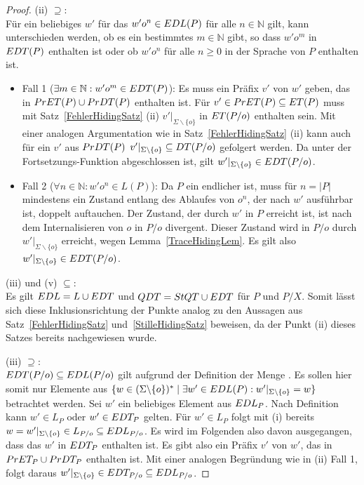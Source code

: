 \begin{proof}
  (ii)  \glqq $\supseteq$\grqq{}:\\
  Für ein beliebiges $w'$ für das $w'o^n\in EDL (P)$ für alle $n\in\mathbb{N}$
  gilt, kann unterschieden werden, ob es ein bestimmtes $m\in\mathbb{N}$ gibt,
  so dass $w'o^m$ in $EDT (P)$ enthalten ist oder ob $w'o^n$ für alle $n\geq
  0$ in der Sprache von $P$ enthalten ist.
  \begin{itemize}
    \item Fall 1 ($\exists m\in\mathbb{N}: w'o^m\in EDT (P)$): Es muss ein
      Präfix $v'$ von $w'$ geben, das in $PrET (P)\cup PrDT (P)$ enthalten
      ist. Für $v'\in PrET (P) \subseteq ET (P)$ muss mit
      Satz~\ref{FehlerHidingSatz} (ii) $v'|_{\Sigma\backslash\{o\}}$ in $ET
      (P/o)$ enthalten sein. Mit einer analogen Argumentation wie in
      Satz~\ref{FehlerHidingSatz} (ii) kann auch für ein $v'$ aus $PrDT (P)$
      $v'|_{\Sigma\backslash\{o\}}\subseteq DT (P/o)$ gefolgert werden. Da
      \EDT{} unter der Fortsetzungs-Funktion \cont{} abgeschlossen ist, gilt
      $w'|_{\Sigma\backslash\{o\}}\in EDT (P/o)$.
    \item Fall 2 ($\forall n\in\mathbb{N}: w'o^n\in L (P)$): Da $P$ ein
      endlicher \MEIO{} ist, muss für $n = |P|$ mindestens ein Zustand entlang
      des Ablaufes von $o^n$, der nach $w'$ ausführbar ist, doppelt auftauchen.
      Der Zustand, der durch $w'$ in $P$ erreicht ist, ist nach dem
      Internalisieren von $o$ in $P/o$ divergent. Dieser Zustand wird in $P/o$
      durch $w'|_{\Sigma\backslash\{o\}}$ erreicht, wegen
      Lemma~\ref{TraceHidingLem}. Es gilt also $w'|_{\Sigma\backslash\{o\}} \in
      EDT (P/o)$.
  \end{itemize}

  (iii) und (v) \glqq $\subseteq$\grqq{}:\\
  Es gilt $EDL = L \cup EDT$ und $QDT = StQT \cup EDT$ für $P$ und $P/X$.
  Somit lässt sich diese Inklusionsrichtung der Punkte analog zu den Aussagen
  aus Satz~\ref{FehlerHidingSatz} und~\ref{StilleHidingSatz} beweisen, da der
  Punkt (ii) dieses Satzes bereits nachgewiesen wurde.

  (iii) \glqq $\supseteq$\grqq{}:\\
  $EDT (P/o)\subseteq EDL (P/o)$ gilt aufgrund der Definition der Menge
  \EDL{}. Es sollen hier somit nur Elemente aus $\{w\in (\Sigma\backslash
  \{o\})^*\mid \exists w'\in EDL(P): w'|_{\Sigma\backslash \{o\}} = w\}$
  betrachtet werden. Sei $w'$ ein beliebiges Element aus $EDL _P$. Nach
  Definition kann $w'\in L_P$ oder $w'\in EDT _P$ gelten. Für $w'\in L_P$ folgt
  mit (i) bereits $w = w'|_{\Sigma\backslash \{o\}}\in L_{P/o}\subseteq EDL
  _{P/o}$. Es wird im Folgenden also davon ausgegangen, dass das $w'$ in $EDT
  _P$ enthalten ist. Es gibt also ein Präfix $v'$ von $w'$, das in $PrET_P
  \cup PrDT _P$ enthalten ist. Mit einer analogen Begründung wie in (ii) Fall
  1, folgt daraus $w'|_{\Sigma\backslash\{o\}} \in EDT _{P/o} \subseteq EDL
  _{P/o}$.


\end{proof}
